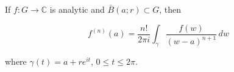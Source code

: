 If $f: G \to \mathbb{C}$ is analytic and $\bar{B}(a; r) \subset G$, then

$$f^{(n)}(a) = \frac{n!}{2\pi i} \int_{\gamma} \frac{f(w)}{(w - a)^{n+1}} \, dw$$

where $\gamma(t) = a + r e^{it}$, $0 \leq t \leq 2\pi$.
